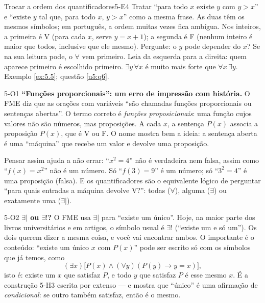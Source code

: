 \begin{erro}{Trocar a ordem dos quantificadores}{5-E4}
 Tratar \enquote{para todo $x$ existe $y$ com $y>x$} e \enquote{existe $y$ tal que, para todo $x$, $y>x$} como a mesma frase.
 As duas têm os mesmos símbolos; em português, a ordem muitas vezes fica ambígua.
 Nos inteiros, a primeira é V (para cada $x$, serve $y=x+1$); a segunda é F (nenhum inteiro é maior que todos, inclusive que ele mesmo).
 Pergunte: o $y$ pode depender do $x$? Se na sua leitura pode, o $\forall$ vem primeiro.
 Leia da esquerda para a direita: quem aparece primeiro é escolhido primeiro. $\exists y\,\forall x$ é muito mais forte que $\forall x\,\exists y$.
 Exemplo \ref{ex:5.5}; questão \ref{u5:q6}.
\end{erro}

\Observacoes

\begin{obs}{5-O1}
\textbf{\enquote{Funções proporcionais}: um erro de impressão com história.} O FME diz que as orações com variáveis \enquote{são chamadas funções proporcionais ou sentenças abertas}. O termo correto é \emph{funções proposicionais}: uma função cujos valores não são números, mas proposições. A cada $x$, a sentença $P(x)$ associa a proposição $P(x)$, que é V ou F. O nome mostra bem a ideia: a sentença aberta é uma \enquote{máquina} que recebe um valor e devolve uma proposição.

Pensar assim ajuda a não errar: \enquote{$x^2=4$} não é verdadeira nem falsa, assim como \enquote{$f(x)=x^2$} não é um número. Só \enquote{$f(3)=9$} é um número; só \enquote{$3^2=4$} é uma proposição (falsa). E os quantificadores são o equivalente lógico de perguntar \enquote{para quais entradas a máquina devolve V?}: todas ($\forall$), alguma ($\exists$) ou exatamente uma ($\exists|$).
\end{obs}

\begin{obs}{5-O2}
\textbf{$\exists|$ ou $\exists!$?} O FME usa $\exists|$ para \enquote{existe um único}. Hoje, na maior parte dos livros universitários e em artigos, o símbolo usual é $\exists!$ (\enquote{existe um e só um}). Os dois querem dizer a mesma coisa, e você vai encontrar ambos. O importante é o conteúdo: \enquote{existe um único $x$ com $P(x)$} pode ser escrito só com os símbolos que já temos, como
\[(\exists x)\big[P(x)\wedge(\forall y)(P(y)\rightarrow y=x)\big],\]
isto é: existe um $x$ que satisfaz $P$, e todo $y$ que satisfaz $P$ é esse mesmo $x$. É a construção 5-H3 escrita por extenso — e mostra que \enquote{único} é uma afirmação de \emph{condicional}: se outro também satisfaz, então é o mesmo.
\end{obs}


